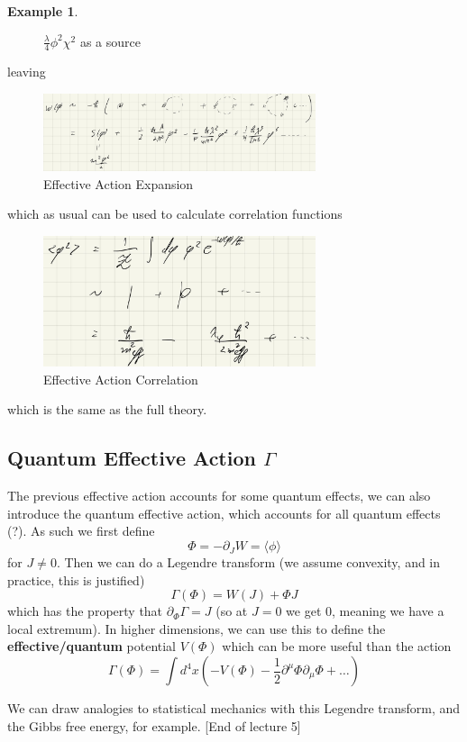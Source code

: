 \documentclass{article}
\theoremstyle{definition}
\newtheorem{example}{Example}
\begin{document}
\begin{example}
\begin{figure}[H]
    \caption{$\frac{\lambda}{4} \phi^2 \chi^2$ as a source}
    \label{lec_5_effective_source}
  \end{figure}
  leaving
  \begin{figure}[H]
    \centering
    \includegraphics[width=8cm]{res/AQFT/lec_5_effective_pertubation}
    \caption{Effective Action Expansion}
    \label{lec_5_effective_pertubation}
  \end{figure}
  which as usual can be used to calculate correlation functions
  \begin{figure}[H]
    \centering
    \includegraphics[width=8cm]{res/AQFT/lec_5_effective_correlation}
    \caption{Effective Action Correlation}
    \label{lec_5_effective_correlation}
  \end{figure}
  which is the same as the full theory.
\end{example}

\subsection{Quantum Effective Action $\Gamma$}

The previous effective action accounts for some quantum effects, we can also
introduce the quantum effective action, which accounts for all quantum effects
(?). As such we first define
\begin{equation}
  \Phi = -\partial_J W = \langle \phi \rangle
\end{equation}
for $J \neq 0$. Then we can do a Legendre transform (we assume convexity, and in
practice, this is justified)
\begin{equation}
  \Gamma(\Phi) = W(J) + \Phi J
\end{equation}
which has the property that $\partial_\Phi \Gamma = J$ (so at $J = 0$ we get
$0$, meaning we have a local extremum). In higher dimensions, we can use this to
define the \textbf{effective/quantum} potential $V(\Phi)$ which can be more useful than
the action
\begin{equation}
  \Gamma(\Phi) = \int d^4x \left( -V(\Phi)
    - \frac{1}{2} \partial^\mu \Phi \partial_\mu \Phi + \dots \right)
\end{equation}

We can draw analogies to statistical mechanics with this Legendre transform, and
the Gibbs free energy, for example. [End of lecture 5]
\end{document}
